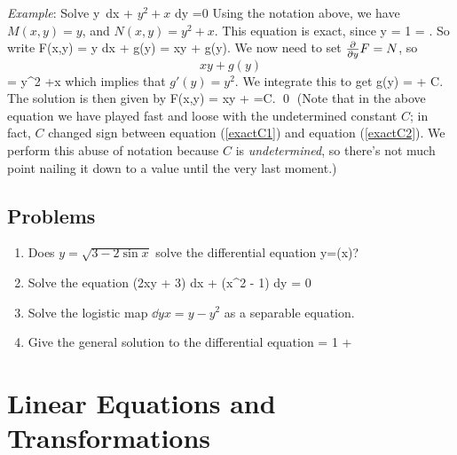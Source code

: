 \documentclass[12pt]{book}
\begin{document}
\noindent\emph{Example}: Solve 
\bee
  y\, dx + \(y^2 + x \) dy =0
\eee
Using the notation above, we have $M(x,y)=y$, and $N(x,y)=y^2 +x$.
This equation is exact, since 
\bee 
  y = 1 = .
\eee
So write
\bee
  F(x,y) 
  = \int y dx + g(y)
  = xy + g(y).
\eee
We now need to set $\frac{\partial }{\partial y} F = N$, so
\bee
  \[xy + g(y)\] = y^2 +x 
\eee
which implies that $g'(y) = y^2$. We integrate this to get 
\be \label{exactC1}
  g(y) =  + C. 
\ee
The solution is then given by
\be \label{exactC2}
  F(x,y) = xy +  =C. \qed
\ee
(Note that in the above equation we have played fast and loose with the
undetermined constant $C$; in fact, $C$ changed sign between equation
(\ref{exactC1}) and equation (\ref{exactC2}). We perform this abuse of notation
because $C$ is \emph{undetermined}, so there's not much point nailing it
down to a value until the very last moment.)

\section{Problems}

\begin{enumerate}
\item
  Does $y = \sqrt{3-2\sin x}$ solve the differential equation 
  \bee
  y=\sin(x)?
  \eee

\item
  Solve the equation
  \bee
  (2xy + 3) dx + (x^2 - 1) dy = 0
  \eee

\item 
  Solve the logistic map $\dd{y}{x} = y - y^2$ as a separable equation.

\item
  Give the general solution to the differential equation
  \bee
   = 1 + 
  \eee

\end{enumerate}



\chapter{Linear Equations and Transformations}
\end{document}
